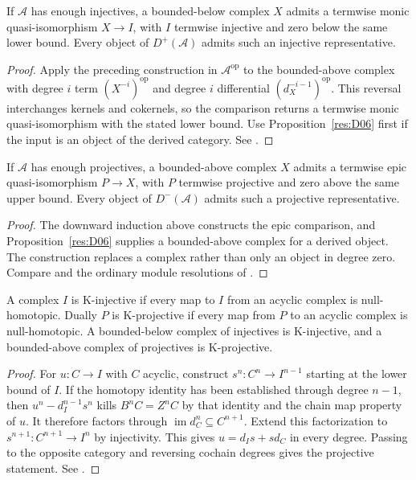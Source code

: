 \begin{theorem}\label{res:R01}
If \(\mathcal A\) has enough injectives, a bounded-below complex \(X\)
admits a termwise monic quasi-isomorphism \(X\to I\), with \(I\) termwise
injective and zero below the same lower bound. Every object of
\(D^+(\mathcal A)\) admits such an injective representative.
\end{theorem}
\begin{proof}
Apply the preceding construction in \(\mathcal A^{\mathrm{op}}\) to
the bounded-above complex with degree \(i\) term \((X^{-i})^{\mathrm{op}}\)
and degree \(i\) differential \((d_X^{-i-1})^{\mathrm{op}}\). This reversal
interchanges kernels and cokernels, so the comparison returns a
termwise monic quasi-isomorphism with the stated lower bound. Use
Proposition~\ref{res:D06} first if the input is an object of the derived
category. See \cite[Tag 013K]{stacks-derived}.
\end{proof}

\begin{theorem}\label{res:R02}
If \(\mathcal A\) has enough projectives, a bounded-above complex \(X\)
admits a termwise epic quasi-isomorphism \(P\to X\), with \(P\) termwise
projective and zero above the same upper bound. Every object of
\(D^-(\mathcal A)\) admits such a projective representative.
\end{theorem}
\begin{proof}
The downward induction above constructs the epic comparison, and
Proposition~\ref{res:D06} supplies a bounded-above complex for a derived
object. The construction replaces a complex rather than only an object
in degree zero. Compare \cite[Tag 0646]{stacks-derived} and the ordinary
module resolutions of \cite[Chapter 10]{p103}.
\end{proof}

\begin{theorem}\label{res:R03}
A complex \(I\) is K-injective if every map to \(I\) from an acyclic
complex is null-homotopic. Dually \(P\) is K-projective if every map
from \(P\) to an acyclic complex is null-homotopic. A bounded-below
complex of injectives is K-injective, and a bounded-above complex of
projectives is K-projective.
\end{theorem}
\begin{proof}
For \(u:C\to I\) with \(C\) acyclic, construct
\(s^n:C^n\to I^{n-1}\) starting at the lower bound of \(I\). If the
homotopy identity has been established through degree \(n-1\), then
\(u^n-d_I^{n-1}s^n\) kills \(B^nC=Z^nC\) by that identity and the chain
map property of \(u\). It therefore factors through
\(\operatorname{im}d_C^n\subseteq C^{n+1}\). Extend this factorization
to \(s^{n+1}:C^{n+1}\to I^n\) by injectivity. This gives
\(u=d_Is+sd_C\) in every degree. Passing to the opposite category
and reversing cochain degrees gives the projective statement.
See \cite[Tags 013R, 0647]{stacks-derived}.
\end{proof}

